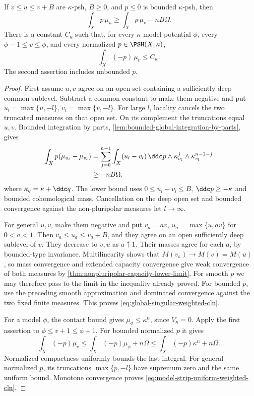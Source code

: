 \begin{lemma}\label{lem:global-singular-weighted-cln}
If $v\leq u\leq v+B$ are $\kappa$-psh, $B\geq0$, and $p\leq0$ is bounded $\kappa$-psh, then
\begin{equation}\label{eq:global-singular-weighted-cln}
 \int_Xp\,\mu_u\geq\int_Xp\,\mu_v-nB\Omega.
\end{equation}
There is a constant $C_\kappa$ such that, for every $\kappa$-model potential $\phi$, every $\phi-1\leq v\leq\phi$, and every normalized $p\in\PSH(X,\kappa)$,
\begin{equation}\label{eq:model-strip-uniform-weighted-cln}
 \int_X(-p)\,\mu_v\leq C_\kappa.
\end{equation}
The second assertion includes unbounded $p$.
\end{lemma}
\begin{proof}
First assume $u,v$ agree on an open set containing a sufficiently deep common sublevel. Subtract a common constant to make them negative and put $u_l=\max\{u,-l\}$, $v_l=\max\{v,-l\}$. For large $l$, locality cancels the two truncated measures on that open set. On its complement the truncations equal $u,v$. Bounded integration by parts, \cref{lem:bounded-global-integration-by-parts}, gives
\[
 \begin{split}
 \int_Xp(\mu_{u_l}-\mu_{v_l})
  &=\sum_{j=0}^{n-1}\int_X(u_l-v_l)\,\ddc p
                  \wedge\kappa_{u_l}^{j}\wedge\kappa_{v_l}^{n-1-j}\\
  &\geq-nB\Omega,
 \end{split}
\]
where $\kappa_q=\kappa+\ddc q$. The lower bound uses $0\leq u_l-v_l\leq B$, $\ddc p\geq-\kappa$ and bounded cohomological mass. Cancellation on the deep open set and bounded convergence against the non-pluripolar measures let $l\to\infty$.

For general $u,v$, make them negative and put $v_a=av$, $u_a=\max\{u,av\}$ for $0<a<1$. Then $v_a\leq u_a\leq v_a+B$, and they agree on an open sufficiently deep sublevel of $v$. They decrease to $v,u$ as $a\uparrow1$. Their masses agree for each $a$, by bounded-type invariance. Multilinearity shows that $M(v_a)\to M(v)=M(u)$, so mass convergence and extended capacity convergence give weak convergence of both measures by \cref{thm:nonpluripolar-capacity-lower-limit}. For smooth $p$ we may therefore pass to the limit in the inequality already proved. For bounded $p$, use the preceding smooth approximation and dominated convergence against the two fixed finite measures. This proves \eqref{eq:global-singular-weighted-cln}.

For a model $\phi$, the contact bound gives $\mu_\phi\leq\kappa^n$, since $V_\kappa=0$. Apply the first assertion to $\phi\leq v+1\leq\phi+1$. For bounded normalized $p$ it gives
\[
 \int_X(-p)\mu_v\leq\int_X(-p)\mu_\phi+n\Omega
                       \leq\int_X(-p)\kappa^n+n\Omega.
\]
Normalized compactness uniformly bounds the last integral. For general normalized $p$, its truncations $\max\{p,-l\}$ have supremum zero and the same uniform bound. Monotone convergence proves \eqref{eq:model-strip-uniform-weighted-cln}.
\end{proof}

